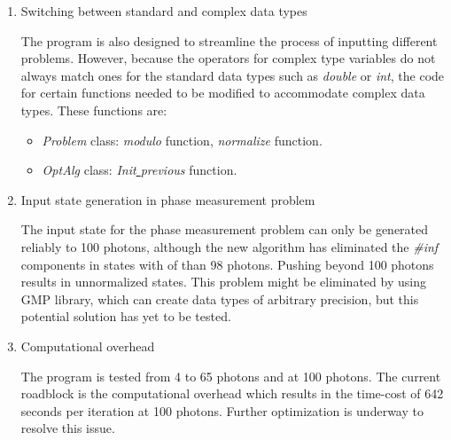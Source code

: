 \documentclass[12pt,letterpaper]{article}
\begin{document}
\begin{enumerate}
\item Switching between standard and complex data types

The program is also designed to streamline the process of inputting different problems. 
However, because the operators for complex type variables do not always match ones for the standard data types such as \textit{double} or \textit{int}, the code for certain functions needed to be modified to accommodate complex data types. 
These functions are:
 \begin{itemize}
 \item \textit{Problem} class: \textit{modulo} function, \textit{normalize} function.
 \item \textit{OptAlg} class: \textit{Init\underline{ }previous} function.  
 \end{itemize}
 
\item Input state generation in phase measurement problem

The input state for the phase measurement problem can only be generated reliably to 100 photons, although the new algorithm has eliminated the \textit{\#inf} components in states with of than 98 photons. 
Pushing beyond 100 photons results in unnormalized states. This problem might be eliminated by using GMP library, which can create data types of arbitrary precision, but this potential solution has yet to be tested. 

\item Computational overhead

The program is tested from 4 to 65 photons and at 100 photons. The current roadblock is the computational overhead which results in the time-cost of 642 seconds per iteration at 100 photons. Further optimization is underway to resolve this issue.

\end{enumerate}
\end{document}

